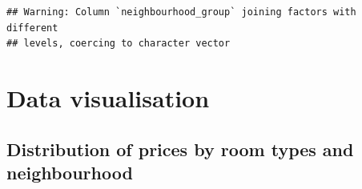 \documentclass[]{article}
\newenvironment{Shaded}{\begin{snugshade}}{\end{snugshade}}
\newcommand{\CommentTok}[1]{\textcolor[rgb]{0.56,0.35,0.01}{\textit{#1}}}
\newcommand{\DataTypeTok}[1]{\textcolor[rgb]{0.13,0.29,0.53}{#1}}
\newcommand{\KeywordTok}[1]{\textcolor[rgb]{0.13,0.29,0.53}{\textbf{#1}}}
\newcommand{\NormalTok}[1]{#1}
\newcommand{\OperatorTok}[1]{\textcolor[rgb]{0.81,0.36,0.00}{\textbf{#1}}}
\newcommand{\StringTok}[1]{\textcolor[rgb]{0.31,0.60,0.02}{#1}}
\begin{document}
\begin{verbatim}
## Warning: Column `neighbourhood_group` joining factors with different
## levels, coercing to character vector
\end{verbatim}

\begin{Shaded}
\end{Shaded}

\hypertarget{data-visualisation}{%
\section{Data visualisation}\label{data-visualisation}}

\hypertarget{distribution-of-prices-by-room-types-and-neighbourhood}{%
\subsection{Distribution of prices by room types and
neighbourhood}\label{distribution-of-prices-by-room-types-and-neighbourhood}}

\begin{Shaded}
\end{Shaded}
\end{document}
